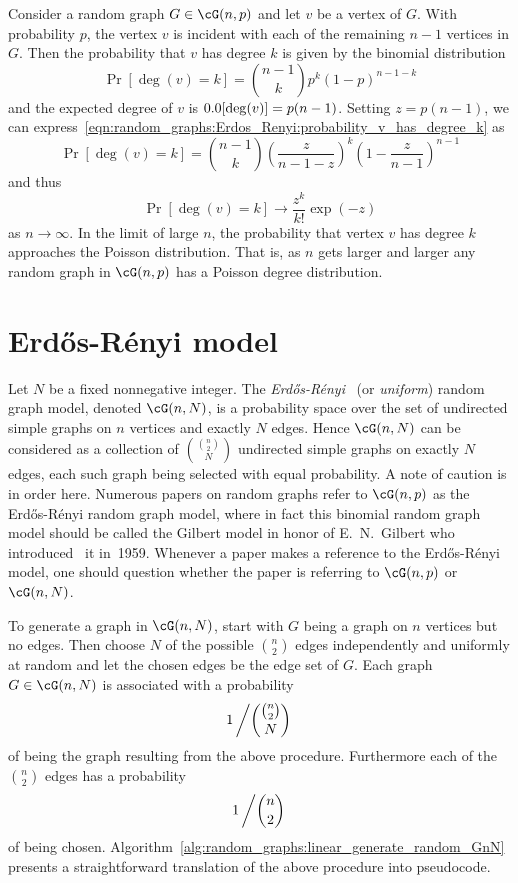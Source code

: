 Consider a random graph $G \in \cG(n,p)$ and let $v$ be a vertex of
$G$. With probability $p$, the vertex $v$ is incident with each of the
remaining $n - 1$ vertices in $G$. Then the probability that $v$ has
degree $k$ is given by the binomial
distribution
\begin{equation}
\label{eqn:random_graphs:Erdos_Renyi:probability_v_has_degree_k}
\Pr[\deg(v) = k]
=
\binom{n-1}{k} p^k (1 - p)^{n-1-k}
\end{equation}
and the expected degree of $v$ is $\E[\deg(v)] = p(n-1)$. Setting
$z = p(n-1)$, we can
express~\eqref{eqn:random_graphs:Erdos_Renyi:probability_v_has_degree_k}
as
\[
\Pr[\deg(v) = k]
=
\binom{n-1}{k}
\left( \frac{z} {n-1-z} \right)^k
\left( 1 - \frac{z}{n-1} \right)^{n-1}
\]
and thus
\[
\Pr[\deg(v) = k]
\to
\frac{z^k}{k!} \exp(-z)
\]
as $n \to \infty$. In the limit of large $n$, the probability that
vertex $v$ has degree $k$ approaches the
Poisson distribution. That is, as $n$ gets
larger and larger any random graph in $\cG(n,p)$ has a Poisson degree
distribution.



\section{Erd\H{o}s-R\'enyi model}
\label{sec:random_graphs:Erdos_Renyi_model}

Let $N$ be a fixed nonnegative integer. The
\emph{Erd\H{o}s-R\'enyi}~\cite{ErdosRenyi1959,ErdosRenyi1960}
(or
\emph{uniform}) random graph model,
denoted $\cG(n,N)$, is a probability space over the set of undirected
simple graphs on $n$ vertices and exactly $N$ edges. Hence $\cG(n,N)$
can be considered as a collection of $\binom{\binom{n}{2}} {N}$
undirected simple graphs on exactly $N$ edges, each such graph being
selected with equal probability. A note of caution is in order
here. Numerous papers on random graphs refer to $\cG(n,p)$ as the
Erd\H{o}s-R\'enyi random graph model, where in fact this binomial
random graph model should be called the Gilbert model in honor of
E.~N.~Gilbert who introduced~\cite{Gilbert1959}
it in~1959. Whenever a paper makes a reference to the
Erd\H{o}s-R\'enyi model, one should question whether the paper is
referring to $\cG(n,p)$ or $\cG(n,N)$.

To generate a graph in $\cG(n,N)$, start with $G$ being a graph on $n$
vertices but no edges. Then choose $N$ of the possible $\binom{n}{2}$
edges independently and uniformly at random and let the chosen edges
be the edge set of $G$. Each graph $G \in \cG(n,N)$ is associated with a
probability
\[
1 \left/ \binom{\binom{n}{2}} {N} \right.
\]
of being the graph resulting from the above procedure. Furthermore
each of the $\binom{n}{2}$ edges has a probability
\[
1 \left/ \binom{n}{2} \right.
\]
of being chosen.
Algorithm~\ref{alg:random_graphs:linear_generate_random_GnN} presents
a straightforward translation of the above procedure into pseudocode.

